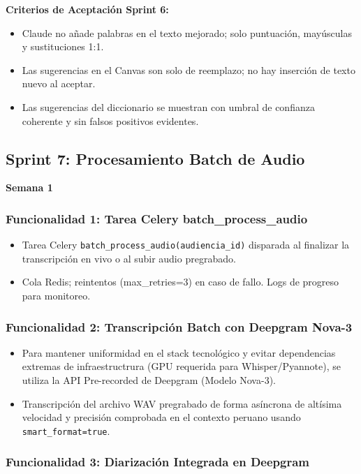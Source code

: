 \documentclass[12pt,a4paper]{report}
\begin{document}
\textbf{Criterios de Aceptación Sprint 6:}
\begin{itemize}
    \item Claude no añade palabras en el texto mejorado; solo puntuación, mayúsculas y sustituciones 1:1.
    \item Las sugerencias en el Canvas son solo de reemplazo; no hay inserción de texto nuevo al aceptar.
    \item Las sugerencias del diccionario se muestran con umbral de confianza coherente y sin falsos positivos evidentes.
\end{itemize}

\subsection{Sprint 7: Procesamiento Batch de Audio}

\textbf{Semana 1}

\subsubsection{Funcionalidad 1: Tarea Celery batch\_process\_audio}

\begin{itemize}
    \item Tarea Celery \texttt{batch\_process\_audio(audiencia\_id)} disparada al finalizar la transcripción en vivo o al subir audio pregrabado.
    \item Cola Redis; reintentos (max\_retries=3) en caso de fallo. Logs de progreso para monitoreo.
\end{itemize}

\subsubsection{Funcionalidad 2: Transcripción Batch con Deepgram Nova-3}

\begin{itemize}
    \item Para mantener uniformidad en el stack tecnológico y evitar dependencias extremas de infraestructrura (GPU requerida para Whisper/Pyannote), se utiliza la API Pre-recorded de Deepgram (Modelo Nova-3).
    \item Transcripción del archivo WAV pregrabado de forma asíncrona de altísima velocidad y precisión comprobada en el contexto peruano usando \texttt{smart\_format=true}.
\end{itemize}

\subsubsection{Funcionalidad 3: Diarización Integrada en Deepgram}
\end{document}
